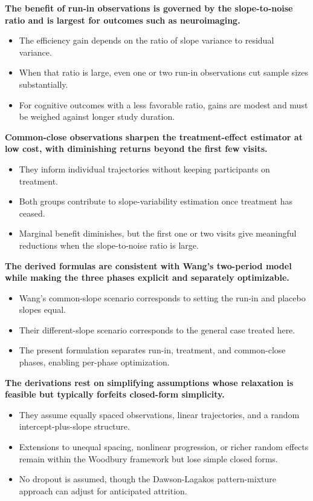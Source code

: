 \documentclass[
  11pt,
]{article}
\begin{document}
\textbf{The benefit of run-in observations is governed by the slope-to-noise ratio and is largest for outcomes such as neuroimaging.}

\begin{itemize}\setlength{\itemsep}{2pt}\setlength{\parskip}{0pt}
\item The efficiency gain depends on the ratio of slope variance to residual variance.
\item When that ratio is large, even one or two run-in observations cut sample sizes substantially.
\item For cognitive outcomes with a less favorable ratio, gains are modest and must be weighed against longer study duration.
\end{itemize}

\textbf{Common-close observations sharpen the treatment-effect estimator at low cost, with diminishing returns beyond the first few visits.}

\begin{itemize}\setlength{\itemsep}{2pt}\setlength{\parskip}{0pt}
\item They inform individual trajectories without keeping participants on treatment.
\item Both groups contribute to slope-variability estimation once treatment has ceased.
\item Marginal benefit diminishes, but the first one or two visits give meaningful reductions when the slope-to-noise ratio is large.
\end{itemize}

\textbf{The derived formulas are consistent with Wang's two-period model while making the three phases explicit and separately optimizable.}

\begin{itemize}\setlength{\itemsep}{2pt}\setlength{\parskip}{0pt}
\item Wang's common-slope scenario corresponds to setting the run-in and placebo slopes equal.
\item Their different-slope scenario corresponds to the general case treated here.
\item The present formulation separates run-in, treatment, and common-close phases, enabling per-phase optimization.
\end{itemize}

\textbf{The derivations rest on simplifying assumptions whose relaxation is feasible but typically forfeits closed-form simplicity.}

\begin{itemize}\setlength{\itemsep}{2pt}\setlength{\parskip}{0pt}
\item They assume equally spaced observations, linear trajectories, and a random intercept-plus-slope structure.
\item Extensions to unequal spacing, nonlinear progression, or richer random effects remain within the Woodbury framework but lose simple closed forms.
\item No dropout is assumed, though the Dawson-Lagakos pattern-mixture approach can adjust for anticipated attrition.
\end{itemize}
\end{document}
